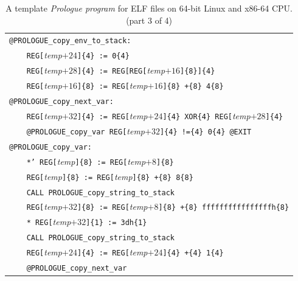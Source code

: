 \documentclass[10pt,twocolumn]{article}
\begin{document}
\begin{table}[!h]
\begin{center}
\begin{tabular}{l}
\texttt{@PROLOGUE\_copy\_env\_to\_stack:}\\ %
\texttt{~~~~REG[}\textit{temp}$ +24 $\texttt{]\{4\} := 0\{4\}}\\ %
\texttt{~~~~REG[}\textit{temp}$ +28 $\texttt{]\{4\} := REG[REG[}\textit{temp}$
+16 $\texttt{]\{8\}]\{4\}}\\ %
\texttt{~~~~REG[}\textit{temp}$ +16 $\texttt{]\{8\} := REG[}\textit{temp}$ +16
$\texttt{]\{8\} +\{8\} 4\{8\}}\\ %
\texttt{@PROLOGUE\_copy\_next\_var:}\\ %
\texttt{~~~~REG[}\textit{temp}$ +32 $\texttt{]\{4\} := REG[}\textit{temp}$ +24
$\texttt{]\{4\} XOR\{4\} REG[}\textit{temp}$ +28 $\texttt{]\{4\}}\\ %
\texttt{~~~~@PROLOGUE\_copy\_var REG[}\textit{temp}$ +32 $\texttt{]\{4\} !=\{4\}
0\{4\} @EXIT}\\ %
\texttt{@PROLOGUE\_copy\_var:}\\ %
\texttt{~~~~*' REG[}\textit{temp}\texttt{]\{8\} := REG[}\textit{temp}$ +8
$\texttt{]\{8\} }\\ %
\texttt{~~~~REG[}\textit{temp}\texttt{]\{8\} := REG[}\textit{temp}\texttt{]\{8\}
+\{8\} 8\{8\}}\\ %
\texttt{~~~~CALL PROLOGUE\_copy\_string\_to\_stack}\\ %
\texttt{~~~~REG[}\textit{temp}$ +32 $\texttt{]\{8\} := REG[}\textit{temp}$ +8
$\texttt{]\{8\} +\{8\} ffffffffffffffffh\{8\}}\\ %
\texttt{~~~~* REG[}\textit{temp}$ +32 $\texttt{]\{1\} := 3dh\{1\} }\\ %
\texttt{~~~~CALL PROLOGUE\_copy\_string\_to\_stack}\\ %
\texttt{~~~~REG[}\textit{temp}$ +24 $\texttt{]\{4\} := REG[}\textit{temp}$ +24
$\texttt{]\{4\} +\{4\} 1\{4\}}\\ %
\texttt{~~~~@PROLOGUE\_copy\_next\_var}\\ %


\end{tabular}
\end{center}
\caption{A template \emph{Prologue program} for ELF files on 64-bit Linux and
x86-64 CPU. (part 3 of 4)} %
\end{table}
\end{document}
